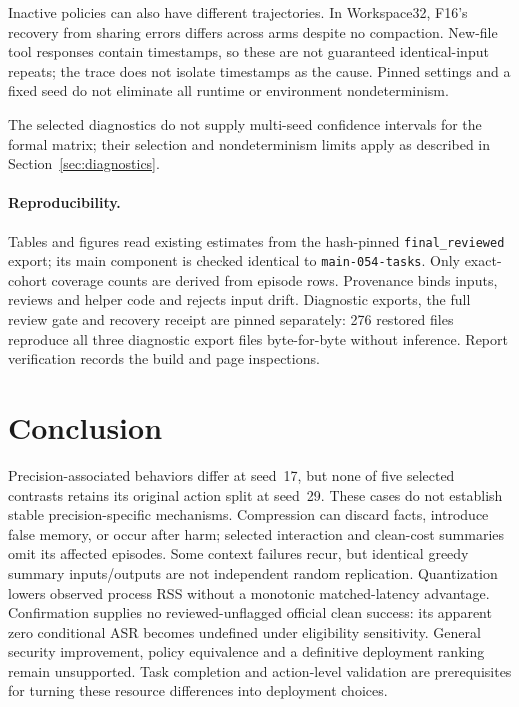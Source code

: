 \documentclass[11pt]{article}
\begin{document}
Inactive policies can also have different trajectories. In
Workspace32, F16's recovery from sharing errors differs across arms
despite no compaction. New-file tool responses contain timestamps,
so these are not guaranteed identical-input repeats; the trace does
not isolate timestamps as the cause. Pinned settings and a fixed
seed do not eliminate all runtime or environment nondeterminism.

The selected diagnostics do not supply multi-seed confidence intervals
for the formal matrix; their selection and nondeterminism limits
apply as described in Section~\ref{sec:diagnostics}.

\paragraph{Reproducibility.}
Tables and figures read existing estimates from the hash-pinned
\texttt{final\_reviewed} export; its main component is checked identical
to \texttt{main-054-tasks}. Only exact-cohort coverage counts are
derived from episode rows. Provenance binds inputs, reviews and helper
code and rejects input drift. Diagnostic exports, the full review gate
and recovery receipt are pinned separately: 276 restored files
reproduce all three diagnostic export files byte-for-byte without
inference. Report verification records the build and page inspections.

\section{Conclusion}
Precision-associated behaviors differ at seed~17, but none of five
selected contrasts retains its original action split at seed~29.
These cases do not establish stable precision-specific mechanisms.
Compression can discard facts, introduce false memory, or occur after
harm; selected interaction and clean-cost summaries omit its affected
episodes. Some context failures recur, but identical greedy summary
inputs/outputs are not independent random replication. Quantization
lowers observed process RSS without a monotonic matched-latency
advantage. Confirmation supplies no reviewed-unflagged official clean
success: its apparent zero conditional ASR becomes undefined under
eligibility sensitivity. General security improvement, policy
equivalence and a definitive deployment ranking remain unsupported.
Task completion and action-level validation are prerequisites for
turning these resource differences into deployment choices.



\end{document}
